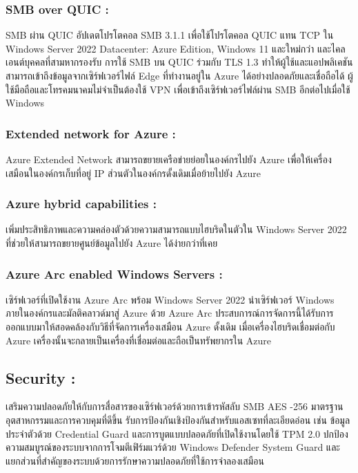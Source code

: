 \hspace{1cm}\subsubsection{SMB over QUIC :}SMB ผ่าน QUIC อัปเดตโปรโตคอล SMB 3.1.1 เพื่อใช้โปรโตคอล QUIC แทน TCP ใน Windows Server 2022 Datacenter: Azure Edition, Windows 11 และใหม่กว่า และไคลเอนต์บุคคลที่สามหากรองรับ การใช้ SMB บน QUIC ร่วมกับ TLS 1.3 ทำให้ผู้ใช้และแอปพลิเคชันสามารถเข้าถึงข้อมูลจากเซิร์ฟเวอร์ไฟล์ Edge ที่ทำงานอยู่ใน Azure ได้อย่างปลอดภัยและเชื่อถือได้ ผู้ใช้มือถือและโทรคมนาคมไม่จำเป็นต้องใช้ VPN เพื่อเข้าถึงเซิร์ฟเวอร์ไฟล์ผ่าน SMB อีกต่อไปเมื่อใช้ Windows 

\hspace{1cm}\subsubsection{Extended network for Azure :}Azure Extended Network สามารถขยายเครือข่ายย่อยในองค์กรไปยัง Azure เพื่อให้เครื่องเสมือนในองค์กรเก็บที่อยู่ IP ส่วนตัวในองค์กรดั้งเดิมเมื่อย้ายไปยัง Azure 
\clearpage

\hspace{1cm}\subsubsection{Azure hybrid capabilities :}เพิ่มประสิทธิภาพและความคล่องตัวด้วยความสามารถแบบไฮบริดในตัวใน Windows Server 2022 ที่ช่วยให้สามารถขยายศูนย์ข้อมูลไปยัง Azure ได้ง่ายกว่าที่เคย 

\hspace{1cm}\subsubsection{Azure Arc enabled Windows Servers :}เซิร์ฟเวอร์ที่เปิดใช้งาน Azure Arc พร้อม Windows Server 2022 นำเซิร์ฟเวอร์ Windows ภายในองค์กรและมัลติคลาวด์มาสู่ Azure ด้วย Azure Arc ประสบการณ์การจัดการนี้ได้รับการออกแบบมาให้สอดคล้องกับวิธีที่จัดการเครื่องเสมือน Azure ดั้งเดิม เมื่อเครื่องไฮบริดเชื่อมต่อกับ Azure เครื่องนั้นจะกลายเป็นเครื่องที่เชื่อมต่อและถือเป็นทรัพยากรใน Azure 

\vspace{2cm}

\hspace{0cm}\subsection{Security :}เสริมความปลอดภัยให้กับการสื่อสารของเซิร์ฟเวอร์ด้วยการเข้ารหัสลับ SMB AES -256 มาตรฐานอุตสาหกรรมและการควบคุมที่ดีขึ้น รับการป้องกันเชิงป้องกันสำหรับแอสเซทที่ละเอียดอ่อน เช่น ข้อมูลประจำตัวด้วย Credential Guard และการบูตแบบปลอดภัยที่เปิดใช้งานโดยใช้ TPM 2.0 ปกป้องความสมบูรณ์ของระบบจากการโจมตีเฟิร์มแวร์ด้วย Windows Defender System Guard และแยกส่วนที่สำคัญของระบบด้วยการรักษาความปลอดภัยที่ใช้การจำลองเสมือน  

